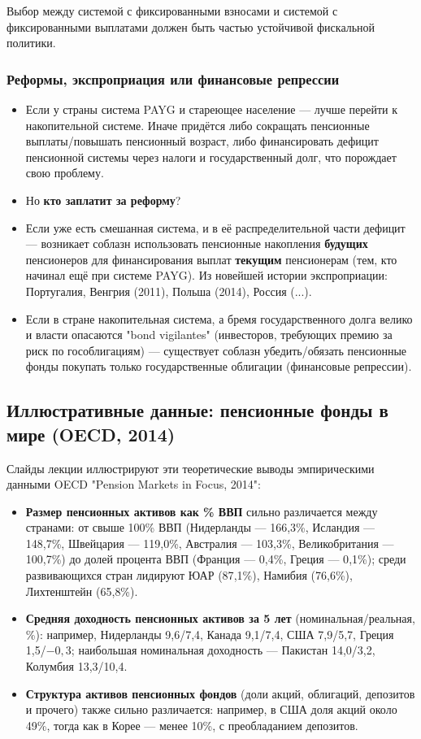 \documentclass[10pt,a4paper]{article}
\begin{document}
Выбор между системой с фиксированными взносами и системой с фиксированными выплатами должен быть частью устойчивой фискальной политики.

\subsubsection{Реформы, экспроприация или финансовые репрессии}

\begin{itemize}[leftmargin=1.3em]
\item Если у страны система PAYG и стареющее население — лучше перейти к накопительной системе. Иначе придётся либо сокращать пенсионные выплаты/повышать пенсионный возраст, либо финансировать дефицит пенсионной системы через налоги и государственный долг, что порождает свою проблему.
\item Но \textbf{кто заплатит за реформу}?
\item Если уже есть смешанная система, и в её распределительной части дефицит — возникает соблазн использовать пенсионные накопления \textbf{будущих} пенсионеров для финансирования выплат \textbf{текущим} пенсионерам (тем, кто начинал ещё при системе PAYG). Из новейшей истории экспроприации: Португалия, Венгрия (2011), Польша (2014), Россия (...).
\item Если в стране накопительная система, а бремя государственного долга велико и власти опасаются "bond vigilantes" (инвесторов, требующих премию за риск по гособлигациям) — существует соблазн убедить/обязать пенсионные фонды покупать только государственные облигации (финансовые репрессии).
\end{itemize}

\subsection{Иллюстративные данные: пенсионные фонды в мире (OECD, 2014)}

Слайды лекции иллюстрируют эти теоретические выводы эмпирическими данными OECD "Pension Markets in Focus, 2014":
\begin{itemize}[leftmargin=1.3em]
\item \textbf{Размер пенсионных активов как \% ВВП} сильно различается между странами: от свыше 100\% ВВП (Нидерланды — 166{,}3\%, Исландия — 148{,}7\%, Швейцария — 119{,}0\%, Австралия — 103{,}3\%, Великобритания — 100{,}7\%) до долей процента ВВП (Франция — 0{,}4\%, Греция — 0{,}1\%); среди развивающихся стран лидируют ЮАР (87{,}1\%), Намибия (76{,}6\%), Лихтенштейн (65{,}8\%).
\item \textbf{Средняя доходность пенсионных активов за 5 лет} (номинальная/реальная, \%): например, Нидерланды 9{,}6/7{,}4, Канада 9{,}1/7{,}4, США 7{,}9/5{,}7, Греция 1{,}5/$-0{,}3$; наибольшая номинальная доходность — Пакистан 14{,}0/3{,}2, Колумбия 13{,}3/10{,}4.
\item \textbf{Структура активов пенсионных фондов} (доли акций, облигаций, депозитов и прочего) также сильно различается: например, в США доля акций около 49\%, тогда как в Корее — менее 10\%, с преобладанием депозитов.
\end{itemize}
\end{document}
